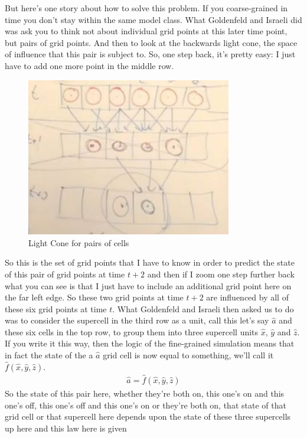\documentclass[]{article}
\begin{document}
But here's one story about how to solve this problem.
If you coarse-grained in time you don't stay within the same model class.
What Goldenfeld and Israeli did was ask you to think not about individual grid points
at this later time point, but pairs of grid points.
And then to look at the backwards light cone, the space of influence that this pair is subject to.
So, one step back, it's pretty easy: I just have to add one more point in the middle row.
\begin{figure}[H]
	\begin{center}
		\caption{Light Cone for pairs of cells}\label{fig:cellular-automaton-light-cone-pairs}
		\includegraphics[width=0.8\textwidth]{cellular-automaton-light-cone-pairs}
	\end{center}
\end{figure}
So this is the set of grid points that I have to know in order to predict the state of this pair of grid points at time $t+2$ and then if I zoom one step further back
what you can see is that I just have to include an additional grid point here on the far left edge.
So these two grid points at time $t+2$ are influenced by all of these six grid points at time $t$. What Goldenfeld and Israeli then asked us to do was to consider the supercell in the third row as a unit, call this let's say $\hat{a}$ and these six cells in the top row, to group them into three supercell units $\hat{x}$, $\hat{y}$ and $\hat{z}$.
If you write it this way,
then the logic of
the fine-grained simulation
means that in fact the state
of the a $\hat{a}$ grid cell
is now equal to something, we'll call it $\hat{f}(\hat{x},\hat{y},\hat{z})$.
\begin{align*}
	\hat{a} = \hat{f}(\hat{x},\hat{y},\hat{z})
\end{align*}
So the state of this pair here, whether they're both on, this one's on and this one's off, this one's off and this one's on or they're both on, that state of that grid cell or that supercell here depends upon the state of these three supercells up here and this law here is given
\end{document}
